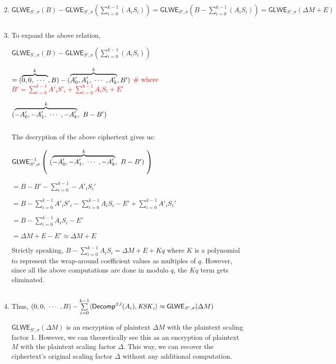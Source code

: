 \begin{myproof}
\begin{enumerate}
$ $
 
 \item $\textsf{GLWE}_{S', \sigma}(B) - \textsf{GLWE}_{S', \sigma} \left( \sum \limits_{i=0}^{k-1} (A_i  S_i )\right) = \textsf{GLWE}_{S', \sigma}(B - \sum \limits_{i=0}^{k-1} (A_i  S_i )) = \textsf{GLWE}_{S', \sigma}(\Delta M + E)$

$ $

\item To expand the above relation, 

$\textsf{GLWE}_{S', \sigma}(B) - \textsf{GLWE}_{S', \sigma} \left(\sum \limits_{i=0}^{k-1} (A_i  S_i)\right)$

$ = (\overbrace{0, 0, \text{ } \text{$\cdots$} \text{ }}^k, B) - (\overbrace{A'_0, A'_1, \text{ } \text{$\cdots$} \text{ }, A'_k}^k, B')  $ \text { } \textcolor{red}{ \# where $B' = \sum\limits_{i=0}^{k-1} A'_iS'_i + \sum\limits_{i=0}^{k-1} A_iS_i + E'$}

$(\overbrace{-A'_0, -A'_1, \text{ } \text{$\cdots$} \text{ }, -A'_k}^k, \text{ } B - B')$

$ $

The decryption of the above ciphertext gives us:

$ \textsf{GLWE}_{S', \sigma}^{-1} \bm\left( \text{ } (\overbrace{-A'_0, -A'_1, \text{ } \text{$\cdots$} \text{ }, -A'_k}^k, \text{ } B - B') \text{ } \bm\right)$

$ = B -  B' - \sum\limits_{i=0}^{k-1} -A'_iS_i'$

$= B - \sum\limits_{i=0}^{k-1} A'_iS'_i - \sum\limits_{i=0}^{k-1} A_iS_i - E' + \sum\limits_{i=0}^{k-1} A'_iS_i'$

$= B - \sum\limits_{i=0}^{k-1} A_iS_i - E'$

$= \Delta M + E - E' \approx \Delta M + E$

Strictly speaking, $B - \sum\limits_{i=0}^{k-1} A_iS_i = \Delta M + E + Kq$ where $K$ is a polynomial to represent the wrap-around coefficient values as multiples of $q$. However, since all the above computations are done in modulo $q$, the $Kq$ term gets eliminated. 

$ $

\item Thus, $ (0, 0, \text{ } \text{$\cdots$} \text{ } , B) - \sum \limits_{i=0}^{k-1} \langle \textsf{Decomp}^{\beta, l}(A_i), \mathit{KSK}_i \rangle \approx \textsf{GLWE}_{S',\sigma}(\Delta M) $ 

$\textsf{GLWE}_{S',\sigma}(\Delta M)$ is an encryption of plaintext $\Delta M$ with the plaintext scaling factor 1. However, we can theoretically see this as an encryption of plaintext $M$ with the plaintext scaling factor $\Delta$. This way, we can recover the ciphertext's original scaling factor $\Delta$ without any additional computation. 
\end{enumerate}
\end{myproof}

